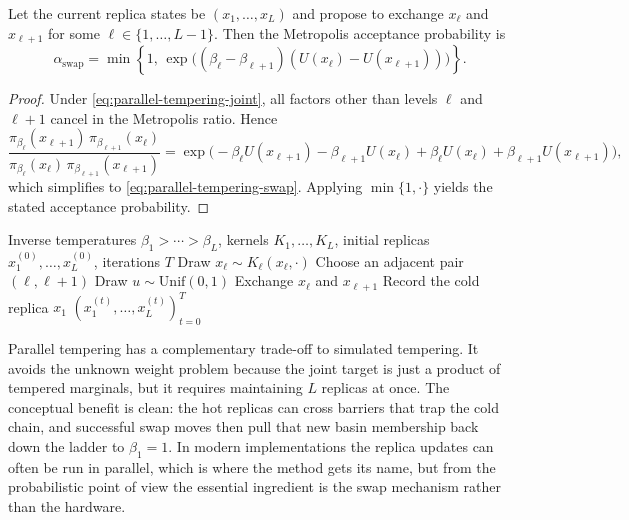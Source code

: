 \begin{proposition}
\label{prop:parallel-tempering-swap}
Let the current replica states be $(x_1,\dots,x_L)$ and propose to exchange $x_\ell$ and $x_{\ell+1}$ for some $\ell\in\{1,\dots,L-1\}$.
Then the Metropolis acceptance probability is
\begin{equation}
  \alpha_{\mathrm{swap}}
  =
  \min\!\left\{
    1,\,
    \exp\!\bigl((\beta_\ell-\beta_{\ell+1})(U(x_\ell)-U(x_{\ell+1}))\bigr)
  \right\}.
  \label{eq:parallel-tempering-swap}
\end{equation}
\end{proposition}
\begin{proof}
Under \eqref{eq:parallel-tempering-joint}, all factors other than levels $\ell$ and $\ell+1$ cancel in the Metropolis ratio.
Hence
\[
  \frac{
    \pi_{\beta_\ell}(x_{\ell+1})\,\pi_{\beta_{\ell+1}}(x_\ell)
  }{
    \pi_{\beta_\ell}(x_\ell)\,\pi_{\beta_{\ell+1}}(x_{\ell+1})
  }
  =
  \exp\!\bigl(-\beta_\ell U(x_{\ell+1})-\beta_{\ell+1}U(x_\ell)
  +\beta_\ell U(x_\ell)+\beta_{\ell+1}U(x_{\ell+1})\bigr),
\]
which simplifies to \eqref{eq:parallel-tempering-swap}.
Applying $\min\{1,\cdot\}$ yields the stated acceptance probability.%
\end{proof}

\begin{algorithm}[H]
  \caption{Parallel tempering}
  \label{alg:parallel-tempering}
  \begin{algorithmic}[1]
    \Require Inverse temperatures $\beta_1>\cdots>\beta_L$, kernels $K_1,\dots,K_L$, initial replicas $x_1^{(0)},\dots,x_L^{(0)}$, iterations $T$
        \State Draw $x_\ell \sim K_\ell(x_\ell,\cdot)$
      \EndFor
      \State Choose an adjacent pair $(\ell,\ell+1)$
      \State Draw $u \sim \mathrm{Unif}(0,1)$
        \State Exchange $x_\ell$ and $x_{\ell+1}$
      \EndIf
      \State Record the cold replica $x_1$
    \EndFor
    \State \Return $(x_1^{(t)},\dots,x_L^{(t)})_{t=0}^T$
  \end{algorithmic}
\end{algorithm}

Parallel tempering has a complementary trade-off to simulated tempering.
It avoids the unknown weight problem because the joint target is just a product of tempered marginals, but it requires maintaining $L$ replicas at once.
The conceptual benefit is clean:
the hot replicas can cross barriers that trap the cold chain, and successful swap moves then pull that new basin membership back down the ladder to $\beta_1=1$.
In modern implementations the replica updates can often be run in parallel, which is where the method gets its name, but from the probabilistic point of view the essential ingredient is the swap mechanism rather than the hardware.

